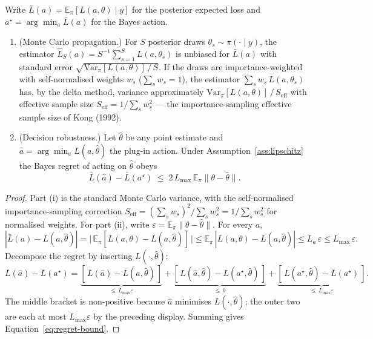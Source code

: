 \begin{proposition}
\label{prop:propagation}
Write $\bar L(a) = \mathbb{E}_\pi[L(a,\theta) \mid y]$ for the posterior expected
loss and $a^\star = \arg\min_{a} \bar L(a)$ for the Bayes action.
\begin{enumerate}
\item[(i)] \textup{(Monte Carlo propagation.)} For $S$ posterior draws
$\theta_s \sim \pi(\cdot \mid y)$, the estimator
$\hat L_S(a) = S^{-1}\sum_{s=1}^{S} L(a,\theta_s)$ is unbiased for $\bar L(a)$ with
standard error $\sqrt{\mathrm{Var}_\pi[L(a,\theta)]\,/\,S}$. If the draws are
importance-weighted with self-normalised weights $w_s$ ($\sum_s w_s = 1$), the
estimator $\sum_s w_s\, L(a,\theta_s)$ has, by the delta method, variance
approximately $\mathrm{Var}_\pi[L(a,\theta)]\,/\,S_{\mathrm{eff}}$ with effective
sample size $S_{\mathrm{eff}} = 1/\sum_s w_s^2$ --- the importance-sampling
effective sample size of Kong (1992).
\item[(ii)] \textup{(Decision robustness.)} Let $\hat\theta$ be any point estimate
and $\hat a = \arg\min_{a} L(a,\hat\theta)$ the plug-in action. Under
Assumption~\ref{ass:lipschitz} the Bayes regret of acting on $\hat\theta$ obeys
\begin{equation}
  \bar L(\hat a) - \bar L(a^\star)
  \;\le\; 2\,L_{\max}\,\mathbb{E}_\pi\|\theta - \hat\theta\| .
  \label{eq:regret-bound}
\end{equation}
\end{enumerate}
\end{proposition}

\begin{proof}
Part (i) is the standard Monte Carlo variance, with the self-normalised
importance-sampling correction $S_{\mathrm{eff}} = (\sum_s w_s)^2 / \sum_s w_s^2 =
1/\sum_s w_s^2$ for normalised weights. For part (ii), write
$\varepsilon = \mathbb{E}_\pi\|\theta - \hat\theta\|$. For every $a$,
\begin{equation*}
  |\bar L(a) - L(a,\hat\theta)|
  = \big|\,\mathbb{E}_\pi[L(a,\theta) - L(a,\hat\theta)]\,\big|
  \le \mathbb{E}_\pi\,|L(a,\theta) - L(a,\hat\theta)|
  \le L_a\,\varepsilon \le L_{\max}\,\varepsilon .
\end{equation*}
Decompose the regret by inserting $L(\cdot,\hat\theta)$:
\begin{equation*}
  \bar L(\hat a) - \bar L(a^\star)
  = \underbrace{[\,\bar L(\hat a) - L(\hat a,\hat\theta)\,]}_{\le\, L_{\max}\varepsilon}
  + \underbrace{[\,L(\hat a,\hat\theta) - L(a^\star,\hat\theta)\,]}_{\le\, 0}
  + \underbrace{[\,L(a^\star,\hat\theta) - \bar L(a^\star)\,]}_{\le\, L_{\max}\varepsilon}.
\end{equation*}
The middle bracket is non-positive because $\hat a$ minimises $L(\cdot,\hat\theta)$;
the outer two are each at most $L_{\max}\varepsilon$ by the preceding display.
Summing gives Equation~\eqref{eq:regret-bound}.
\end{proof}

